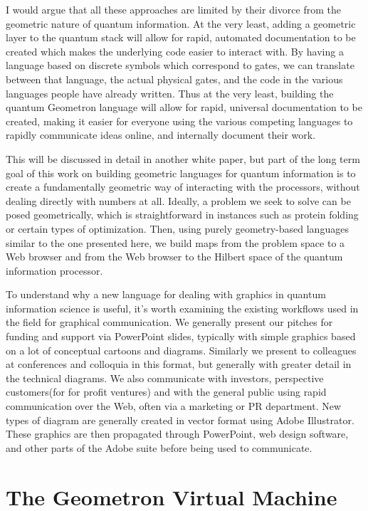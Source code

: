 \documentclass[11pt]{article}
\begin{document}
    I would argue that all these approaches are limited by their divorce from the geometric nature of quantum information.  At the very least, adding a geometric layer to the quantum stack will allow for rapid, automated documentation to be created which makes the underlying code easier to interact with.  By having a language based on discrete symbols which correspond to gates, we can translate between that language, the actual physical gates, and the code in the various languages people have already written.  Thus at the very least, building the quantum Geometron language will allow for rapid, universal documentation to be created, making it easier for everyone using the various competing languages to rapidly communicate ideas online, and internally document their work.  


    This will be discussed in detail in another white paper, but part of the long term goal of this work on building geometric languages for quantum information is to create a fundamentally geometric way of interacting with the processors, without dealing directly with numbers at all.  Ideally, a problem we seek to solve can be posed geometrically, which is straightforward in instances such as protein folding or certain types of optimization. Then, using purely geometry-based languages similar to the one presented here, we build maps from the problem space to a Web browser and from the Web browser to the Hilbert space of the quantum information processor.  


    To understand why a new language for dealing with graphics in quantum information science is useful, it's worth examining the existing workflows used in the field for graphical communication.  We generally present our pitches for funding and support via PowerPoint slides, typically with simple graphics based on a lot of conceptual cartoons and diagrams.  Similarly we present to colleagues at conferences and colloquia in this format, but generally with greater detail in the technical diagrams.  We also communicate with investors, perspective customers(for for profit ventures) and with the general public using rapid communication over the Web, often via a marketing or PR department.  New types of diagram are generally created in vector format using Adobe Illustrator.  These graphics are then propagated through PowerPoint, web design software, and other parts of the Adobe suite before being used to communicate.  




\section{The Geometron Virtual Machine}
\end{document}
